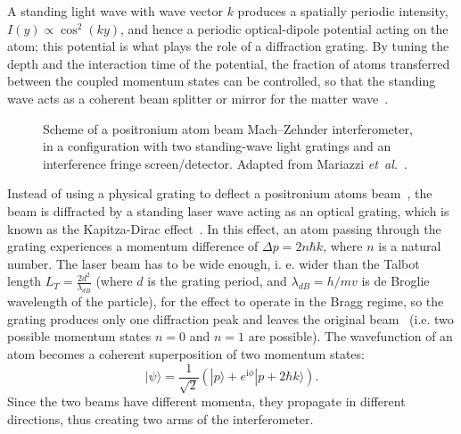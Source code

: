 \documentclass[12pt]{report}
\begin{document}
A standing light wave with wave vector $k$ produces a spatially periodic intensity, $I(y)\propto\cos^{2}(ky)$, and hence a periodic optical-dipole potential acting on the atom; this potential is what plays the role of a diffraction grating. By tuning the depth and the interaction time of the potential, the fraction of atoms transferred between the coupled momentum states can be controlled, so that the standing wave acts as a coherent beam splitter or mirror for the matter wave~\cite{Oberthaler_2002,Dürr_Rempe_1999}.

\begin{figure}[ht!]
    \centering
    \resizebox{0.8\textwidth}{!}{}
    \caption[Mach--Zehnder interferometer layout]{Scheme of a positronium atom beam Mach--Zehnder interferometer, in a configuration with two standing-wave light gratings and an interference fringe screen/detector. Adapted from Mariazzi \emph{et~al.}~\cite{Mariazzi_Caravita_Doser_Nebbia_Brusa_2020}.}
    \label{fig:machidea}
    
\end{figure}

Instead of using a physical grating to deflect a positronium atoms beam~\cite{Oberthaler_Bernet_Rasel_Schmiedmayer_Zeilinger_1996}, the beam is diffracted by a standing laser wave acting as an optical grating, which is known as the Kapitza-Dirac effect~\cite{Kapitza_Dirac_1933}.
In this effect, an atom passing through the grating experiences a momentum difference of \(\Delta p=2n\hbar k\), where \(n\) is a natural number.
The laser beam has to be wide enough, i. e. wider than the Talbot length \(L_T=\frac{2d^2}{\lambda_{dB}} \) (where \(d\) is the grating period, and \(\lambda_{dB}=h/mv\) is de Broglie wavelength of the particle), for the effect to operate in the Bragg regime, so the grating produces only one diffraction peak and leaves the original beam~\cite{Oberthaler_2002} (i.e. two possible momentum states \(n=0\) and \(n=1\) are possible).
The wavefunction of an atom becomes a coherent superposition of two momentum states:
\begin{equation} \lvert \psi \rangle = \frac{1}{\sqrt{2}} \left( |p \rangle + e^{\mathrm{i}\phi} |p + 2\hbar k \rangle \right).\end{equation} 
Since the two beams have different momenta, they propagate in different directions, thus creating two arms of the interferometer.
\end{document}
